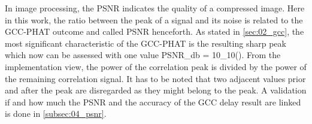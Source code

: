 In image processing, the \acf{PSNR} indicates the quality of a compressed
image. Here in this work, the ratio between the peak of a signal
and its noise is related to the \ac{GCC-PHAT} outcome and called \ac{PSNR}
henceforth.
As stated in \cref{sec:02_gcc}, the most significant characteristic
of the \ac{GCC-PHAT} is the resulting sharp peak which now can be
assessed with one value
\bal
    PSNR_{db} = 10\log_{10}\left(\right).
    \label{eq:03_psnr}
\eal
From the implementation view, the power of the correlation peak is divided by
the power of the remaining correlation signal.
It has to be noted that two adjacent values prior and after the peak
are disregarded as they might belong to the peak.
A validation if and how much the \ac{PSNR} and the accuracy of the \ac{GCC}
delay result are linked is done in \cref{subsec:04_psnr}.